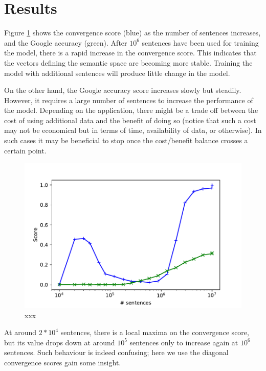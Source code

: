 \documentclass{article} %
\begin{document}
\section{Results}
\label{sec:results}

Figure \ref{fig:scores} shows the convergence score (blue) as the number of sentences increases, and the Google accuracy (green). After $10^6$ sentences have been used for training the model, there is a rapid increase in the convergence score. This indicates that the vectors defining the semantic space are becoming more stable. Training the model with additional sentences will produce little change in the model.

On the other hand, the Google accuracy score increases slowly but steadily. However, it requires a large number of sentences to increase the performance of the model. Depending on the application, there might be a trade off between the cost of using additional data and the benefit of doing so (notice that such a cost may not be economical but in terms of time, availability of data, or otherwise). In such cases it may be beneficial to stop once the cost/benefit balance crosses a certain point.

\begin{figure}
 \includegraphics[width=\textwidth]{scoresVsNoSentences.pdf} 
 \caption{xxx}
 \label{fig:scores}
\end{figure}

At around $2 * 10^4$ sentences, there is a local maxima on the convergence score, but its value drops down at around $10^5$ sentences only to increase again at $10^6$ sentences. Such behaviour is indeed confusing; here we use the diagonal convergence scores gain some insight.
\end{document}
